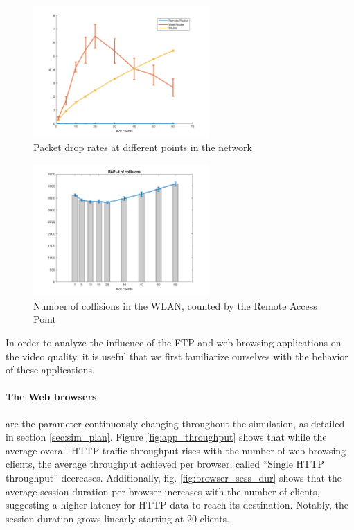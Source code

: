 \documentclass[
10pt, %
a4paper, %
oneside, %
headinclude,footinclude, %
BCOR5mm, %
]{scrartcl}
\begin{document}
\begin{figure}[!ht]
  \centering
  \includegraphics[width=0.6\textwidth]{../matlab/images/finalnocctv/Network Packet Drop Rates.png}
  \caption{Packet drop rates at different points in the network} \label{fig:net_drop}
\end{figure}
\begin{figure}[!ht]
  \centering
  \includegraphics[width=0.6\textwidth]{../matlab/images/finalnocctv/RAP -Number of collisions.png}
  \caption{Number of collisions in the WLAN, counted by the Remote Access Point} \label{fig:rap_collisions}
\end{figure}

In order to analyze the influence of the FTP and web browsing applications on the video quality, it is useful that we first familiarize ourselves with the behavior of these applications.

\paragraph{The Web browsers} are the parameter continuously changing throughout the simulation, as detailed in section \ref{sec:sim_plan}. Figure \ref{fig:app_throughput} shows that while the average overall HTTP traffic throughput rises with the number of web browsing clients, the average throughput achieved per browser, called ``Single HTTP throughput'' decreases. Additionally, fig. \ref{fig:browser_sess_dur} shows that the average session duration per browser increases with the number of clients, suggesting a higher latency for HTTP data to reach its destination. Notably, the session duration grows linearly starting at 20 clients.
\end{document}
